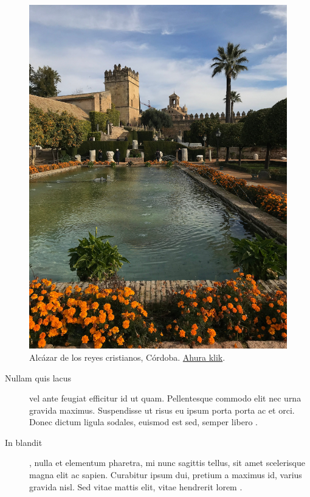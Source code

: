\begin{figure}
    \centering
    \includegraphics[width=\linewidth]{figures/examples/example1.jpg}
    \caption[Alcázar de los reyes cristianos, Córdoba.]{Alcázar de los reyes cristianos, Córdoba. \href{https://es.wikipedia.org/wiki/Archivo:Alcazar_Cordoba.jpg}{Ahura klik}.}
    \label{fig:apxA:cordoba}
\end{figure}

\lipsum[76] 

\begin{description}
    \item[Nullam quis lacus] vel ante feugiat efficitur id ut quam. Pellentesque commodo elit nec urna gravida maximus. Suspendisse ut risus eu ipsum porta porta ac et orci. Donec dictum ligula sodales, euismod est sed, semper libero . 
    \item[In blandit], nulla et elementum pharetra, mi nunc sagittis tellus, sit amet scelerisque magna elit ac sapien. Curabitur ipsum dui, pretium a maximus id, varius gravida nisl. Sed vitae mattis elit, vitae hendrerit lorem \cite{an1368-analog-ferrite, itu-r-reg-articles}.
\end{description}

